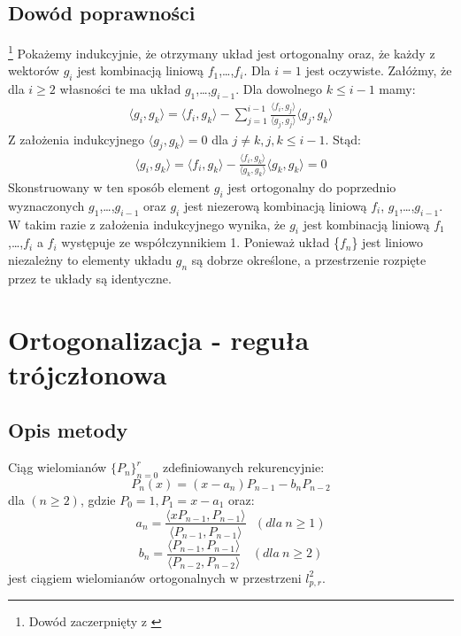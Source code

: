 \documentclass[12pt,wide]{mwart}
\begin{document}
\subsection{Dowód poprawności}\footnote{Dowód zaczerpnięty z \cite[strona 90]{JMJ}} 
Pokażemy indukcyjnie, że otrzymany układ jest ortogonalny oraz, że każdy z wektorów $g_i$ jest kombinacją liniową $f_1$,\ldots,$f_i$. Dla $i=1$ jest oczywiste. Załóżmy, że dla $i \geq 2$ własności te ma układ $g_1$,\ldots,$g_{i-1}$. Dla dowolnego $ k \leq i-1$ mamy:
\begin{eqnarray*}
	\langle g_i,g_k\rangle = \langle f_i,g_k\rangle - \sum^{i-1}_{j=1} \frac{\langle f_i,g_j\rangle}{\langle g_j,g_j\rangle}\langle g_j,g_k\rangle
\end{eqnarray*}
Z założenia indukcyjnego $\langle g_j,g_k\rangle = 0$ dla $j\neq k, j,k \leq i-1$. Stąd:
\begin{eqnarray*}
	\langle g_i,g_k\rangle = \langle f_i,g_k\rangle - \frac{\langle f_i,g_k\rangle}{\langle g_k,g_k\rangle}\langle g_k,g_k\rangle = 0
\end{eqnarray*}
Skonstruowany w ten sposób element $g_i$ jest ortogonalny do poprzednio wyznaczonych $g_1$,\ldots,$g_{i-1}$ oraz $g_i$ jest niezerową kombinacją liniową $f_i$, $g_1$,\ldots,$g_{i-1}$. W takim razie z założenia indukcyjnego wynika, że $g_i$ jest kombinacją liniową $f_1$,\ldots,$f_i$ a $f_i$ występuje ze współczynnikiem 1. Ponieważ układ \{$f_n$\} jest liniowo niezależny to elementy układu {$g_n$} są dobrze określone, a przestrzenie rozpięte przez te układy są identyczne.

\section{Ortogonalizacja - reguła trójczłonowa}
 
\subsection{Opis metody}
Ciąg wielomianów $\{P_n\}^r_{n=0}$ zdefiniowanych rekurencyjnie:
$$
	P_n(x) = (x-a_n)P_{n-1} - b_n P_{n-2}
$$
dla $(n \geq 2)$, gdzie $P_0 = 1, P_1 = x - a_1$ oraz:
$$
	a_n = \frac{\langle xP_{n-1},P_{n-1} \rangle}{\langle P_{n-1},P_{n-1} \rangle} \ \ \ (dla \ n \geq 1)
$$
$$
	b_n = \frac{\langle P_{n-1},P_{n-1} \rangle}{\langle P_{n-2},P_{n-2} \rangle} \ \ \ \ (dla \ n \geq 2)
$$
jest ciągiem wielomianów ortogonalnych w przestrzeni $l^2_{p,r}$.
\end{document}
